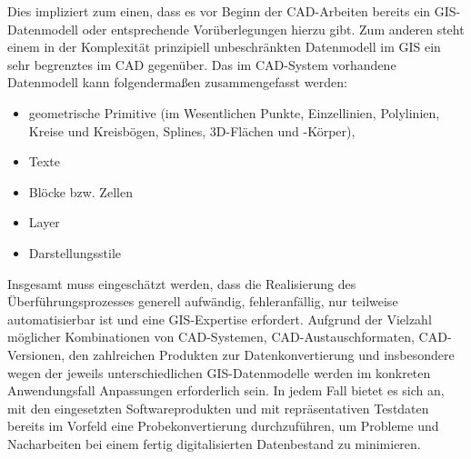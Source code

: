 Dies impliziert zum einen, dass es vor Beginn der CAD-Arbeiten bereits ein GIS-Datenmodell oder entsprechende Vorüberlegungen hierzu gibt. Zum anderen steht einem in der Komplexität prinzipiell unbeschränkten Datenmodell im GIS ein sehr begrenztes im CAD gegenüber. Das im CAD-System vorhandene Datenmodell kann folgendermaßen zusammengefasst werden:
\begin{itemize}
	\item geometrische Primitive (im Wesentlichen Punkte, Einzellinien, Polylinien, Kreise und Kreisbögen, Splines, 3D-Flächen und -Körper),
	\item Texte
	\item Blöcke bzw. Zellen
	\item Layer
	\item Darstellungsstile
\end{itemize}

Insgesamt muss eingeschätzt werden, dass die Realisierung des Überführungsprozesses generell aufwändig, fehleranfällig, nur teilweise automatisierbar ist und eine GIS-Expertise erfordert. Aufgrund der Vielzahl möglicher Kombinationen von CAD-Systemen, CAD-Austauschformaten, CAD-Versionen, den zahlreichen Produkten zur Datenkonvertierung und insbesondere wegen der jeweils unterschiedlichen GIS-Datenmodelle werden im konkreten Anwendungsfall Anpassungen erforderlich sein. In jedem Fall bietet es sich an, mit den eingesetzten Softwareprodukten und mit repräsentativen Testdaten bereits im Vorfeld eine Probekonvertierung durchzuführen, um Probleme und Nacharbeiten bei einem fertig digitalisierten Datenbestand zu minimieren.


